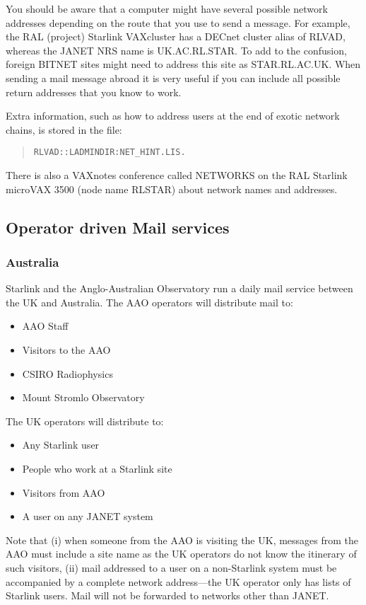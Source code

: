 You should be aware that a computer might have several possible network
addresses depending on the route that you use to send a message. For example,
the RAL (project) Starlink VAXcluster has a DECnet cluster alias of RLVAD,
whereas the JANET NRS name is UK.AC.RL.STAR. To add to the confusion, foreign
BITNET sites might need to address this site as STAR.RL.AC.UK. When sending a
mail message abroad it is very useful if you can include all possible return
addresses that you know to work.

Extra information, such as how to address users at the end of exotic network
chains, is stored in the file:
\begin{quote}
{\tt RLVAD::LADMINDIR:NET\_HINT.LIS.}
\end{quote}
There is also a VAXnotes conference called NETWORKS on the RAL Starlink
microVAX 3500
(node name RLSTAR) about network names and addresses.

\subsection{Operator driven Mail services}
\subsubsection{Australia}
\label{oper-mail}

Starlink and the Anglo-Australian Observatory run a daily mail service between
the UK and Australia.
The AAO operators will distribute mail to:
\begin{itemize}
\item AAO Staff
\item Visitors to the AAO
\item CSIRO Radiophysics
\item Mount Stromlo Observatory
\end{itemize}
The UK operators will distribute to:
\begin{itemize}
\item Any Starlink user
\item People who work at a Starlink site
\item Visitors from AAO
\item A user on any JANET system
\end{itemize}
Note that (i) when someone from the AAO is visiting the UK, messages from
the AAO must include a site name as the UK
operators do not know the itinerary of such visitors, (ii) mail addressed to a
user on a non-Starlink system must be accompanied by a complete network
address---the UK operator only has lists of Starlink users.
Mail will not be forwarded to networks other than JANET.

